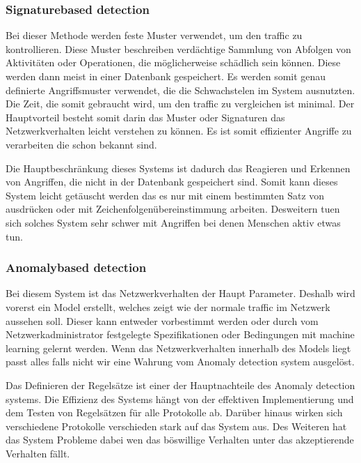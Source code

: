 \documentclass[letterpaper,10pt,ngerman]{sphinxmanual}
\begin{document}
\subsubsection{Signature\sphinxhyphen{}based detection}
\label{\detokenize{ids:signature-based-detection}}
Bei dieser Methode werden feste Muster verwendet, um den traffic zu kontrollieren.
Diese Muster beschreiben verdächtige Sammlung von Abfolgen von Aktivitäten oder
Operationen, die möglicherweise schädlich sein können. Diese werden dann meist in einer
Datenbank gespeichert. Es werden somit genau definierte Angriffsmuster verwendet,
die die Schwachstelen im System ausnutzten. Die Zeit, die somit gebraucht wird, um den
traffic zu vergleichen ist minimal. Der Hauptvorteil besteht somit darin das Muster oder
Signaturen das Netzwerkverhalten leicht verstehen zu können. Es ist somit effizienter
Angriffe zu verarbeiten die schon bekannt sind.

Die Hauptbeschränkung dieses Systems ist dadurch das Reagieren und Erkennen von Angriffen,
die nicht in der Datenbank gespeichert sind. Somit kann dieses System leicht getäuscht
werden das es nur mit einem bestimmten Satz von ausdrücken oder mit Zeichenfolgenübereinstimmung
arbeiten. Desweitern tuen sich solches System sehr schwer mit Angriffen bei denen
Menschen aktiv etwas tun.


\subsubsection{Anomaly\sphinxhyphen{}based detection}
\label{\detokenize{ids:anomaly-based-detection}}
Bei diesem System ist das Netzwerkverhalten der Haupt Parameter. Deshalb wird vorerst ein
Model erstellt, welches zeigt wie der normale traffic im Netzwerk aussehen soll.
Dieser kann entweder vorbestimmt werden oder durch vom Netzwerkadministrator festgelegte
Spezifikationen oder Bedingungen mit machine learning gelernt werden. Wenn das
Netzwerkverhalten innerhalb des Models liegt passt alles falls nicht wir eine Wahrung
vom Anomaly detection system ausgelöst.

Das Definieren der Regelsätze ist einer der Hauptnachteile des Anomaly detection systems.
Die Effizienz des Systems hängt von der effektiven Implementierung und dem Testen von
Regelsätzen für alle Protokolle ab. Darüber hinaus wirken sich verschiedene Protokolle
verschieden stark auf das System aus. Des Weiteren hat das System Probleme dabei wen das
böswillige Verhalten unter das akzeptierende Verhalten fällt.
\end{document}
